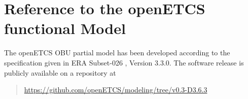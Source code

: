 \section{Reference to the openETCS functional Model}
The openETCS OBU partial model has been developed according to the specification given in ERA Subset-026 \cite{subset-026}, Version 3.3.0. The software release is publicly available on a repository at 
\begin{quotation}
\centering
\url{https://github.com/openETCS/modeling/tree/v0.3-D3.6.3}
\end{quotation}


